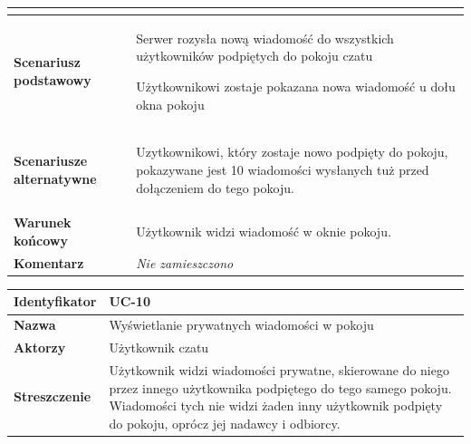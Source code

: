 {\begin{tabular}{ | l | l | }
{		}
		\\

	\hline
		\parbox[t]{4cm}{\textbf{Scenariusz podstawowy}} & \parbox[t]{11cm}{
			\begin{enumreq}
				\item Serwer rozysła nową wiadomość do wszystkich
				użytkowników podpiętych do pokoju czatu
				\item Użytkownikowi zostaje pokazana nowa wiadomość
				u dołu okna pokoju
			\end{enumreq}
		}
		\\
		
	\hline
		\parbox[t]{4cm}{\textbf{Scenariusze alternatywne}} & \parbox[t]
		{11cm}{
			\begin{enumreq}
				\item Uzytkownikowi, który zostaje nowo podpięty do pokoju,
				pokazywane jest 10 wiadomości wysłanych tuż przed dołączeniem
				do tego pokoju.
			\end{enumreq}
		}
		\\
		
	\hline
		\parbox[t]{4cm}{\textbf{Warunek końcowy}} & \parbox[t]{11cm}{
			Użytkownik widzi wiadomość w oknie pokoju.
		}
		\\
		
	\hline
		\parbox[t]{4cm}{\textbf{Komentarz}} & \parbox[t]{11cm}{
			\textit{Nie zamieszczono}
		}
		\\

	\hline
\end{tabular}

\vspace{2em}

\begin{tabular}{ | l | l | }
	\hline
		\textbf{Identyfikator} & 
		UC-10
		\\
		
	\hline
		\textbf{Nazwa} & 
		Wyświetlanie prywatnych wiadomości w pokoju
		\\
		
	\hline
		\textbf{Aktorzy} & \parbox[t]{11cm}{
			Użytkownik czatu
		}\\
		 
	\hline
		\parbox[t]{4cm}{\textbf{Streszczenie}} & \parbox[t]{11cm}{
			Użytkownik widzi wiadomości prywatne, skierowane do niego przez
			innego użytkownika podpiętego do tego samego pokoju. Wiadomości
			tych nie widzi żaden inny użytkownik podpięty do pokoju, oprócz
			jej nadawcy i odbiorcy.
			
		}\\
		

\end{tabular}}
